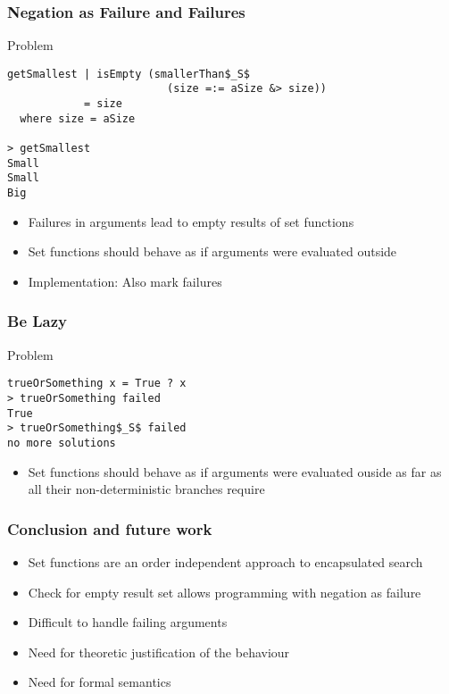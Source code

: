 \documentclass[utf8]{beamer}
\begin{document}
\begin{frame}[fragile]
\frametitle{Negation as Failure and Failures}
\begin{block}{Problem}
\begin{lstlisting}[mathescape]
getSmallest | isEmpty (smallerThan$_S$ 
                         (size =:= aSize &> size)) 
            = size
  where size = aSize

> getSmallest
Small
Small
Big
\end{lstlisting}
\end{block}
\begin{itemize}
 \item Failures in arguments lead to empty results of set functions
 \item Set functions should behave as if arguments were
       evaluated outside
 \item Implementation: Also mark failures
\end{itemize}
\end{frame}

\begin{frame}[fragile]
\frametitle{Be Lazy}
\begin{block}{Problem}
\begin{lstlisting}[mathescape]
trueOrSomething x = True ? x
> trueOrSomething failed
True
> trueOrSomething$_S$ failed
no more solutions
\end{lstlisting}
\end{block}
\begin{itemize}
\item Set functions should behave as if arguments were
      evaluated ouside as far as all their non-deterministic
      branches require
\end{itemize}
\end{frame}

\begin{frame}
\frametitle{Conclusion and future work}
\begin{itemize}
\item Set functions are an order independent approach to encapsulated
      search
\item Check for empty result set allows programming with negation as failure
\item Difficult to handle failing arguments
\item Need for theoretic justification of the behaviour
\item Need for formal semantics
\end{itemize}
\end{frame}
\end{document}

